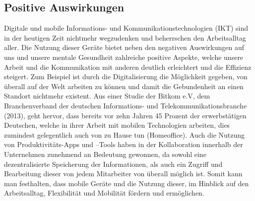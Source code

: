 \documentclass[12pt,a4paper]{article}
\begin{document}
\subsection*{Positive Auswirkungen}
Digitale und mobile Informations- und Kommunikationstechnologien (IKT) sind in der heutigen Zeit nichtmehr wegzudenken und beherrschen den Arbeitsalltag aller. Die Nutzung dieser Geräte bietet neben den negativen Auswirkungen auf uns und unsere mentale Gesundheit zahlreiche positive Aspekte, welche unsere Arbeit und die Kommunikation mit anderen deutlich erleichtert und die Effizienz steigert. Zum Beispiel ist durch die Digitalisierung die Möglichkeit gegeben, von überall auf der Welt arbeiten zu können und damit die Gebundenheit an einen Standort nichtmehr existent. Aus einer Studie der Bitkom e.V, dem Branchenverband der deutschen Informations- und Telekommunikationsbranche (2013), geht hervor, dass bereits vor zehn Jahren 45 Prozent der erwerbstätigen Deutschen, welche in ihrer Arbeit mit mobilen Technologien arbeiten, dies zumindest gelegentlich auch von zu Hause tun (Homeoffice). Auch die Nutzung von Produktivitäts-Apps und –Tools haben in der Kollaboration innerhalb der Unternehmen zunehmend an Bedeutung gewonnen, da sowohl eine dezentralisierte Speicherung der Informationen, als auch ein Zugriff und Bearbeitung dieser von jedem Mitarbeiter von überall möglich ist. Somit kann man festhalten, dass mobile Geräte und die Nutzung dieser, im Hinblick auf den Arbeitsalltag, Flexibilität und Mobilität fördern und ermöglichen. 
 
\end{document}
